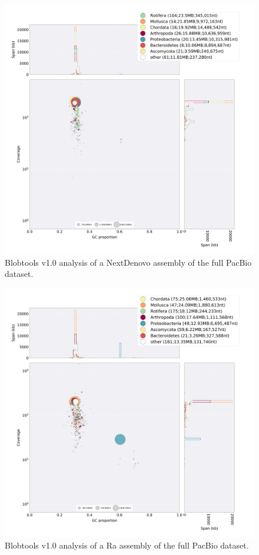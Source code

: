   \begin{figure}[ht]
    \centering
     \includegraphics[width=15cm]{fig/benchmark/PB_ND.png}
   \caption{Blobtools v1.0 analysis of a NextDenovo assembly of the full PacBio dataset.}
   \label{fig:blobtools_NextDenovo_pb}
 \end{figure}

 \begin{figure}[ht]
    \centering
     \includegraphics[width=15cm]{fig/benchmark/PB_RA.png}
   \caption{Blobtools v1.0 analysis of a Ra assembly of the full PacBio dataset.}
   \label{fig:blobtools_ra_pb}
 \end{figure}
 
